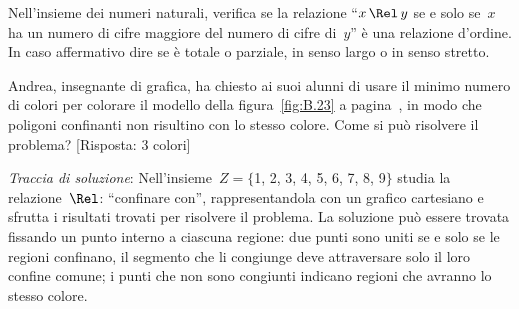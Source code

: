\begin{multicols}{2}
\begin{esercizio}
\label{ese:B.62}
Nell'insieme dei numeri naturali, verifica se la relazione ``$x \,\Rel\, y$ se e solo se~$x$ ha un numero di cifre maggiore del numero di cifre di~$y$''
è una relazione d'ordine. In caso affermativo dire se è totale o parziale, in senso largo o in senso stretto.
\end{esercizio}

\begin{esercizio}
\label{ese:B.63}
Andrea, insegnante di grafica, ha chiesto ai suoi alunni di usare il minimo numero di colori per colorare il modello della figura~\ref{fig:B.23} a pagina~\pageref{fig:B.23},
in modo che poligoni confinanti non risultino con lo stesso colore. Come si può risolvere il problema? [Risposta: 3 colori]

\emph{Traccia di soluzione}: Nell'insieme~$Z =\{$1, 2, 3, 4, 5, 6, 7, 8, 9$\}$ studia la relazione~$\Rel$: ``confinare con'', rappresentandola con un grafico cartesiano e sfrutta
i risultati trovati per risolvere il problema.
La soluzione può essere trovata fissando un punto interno a ciascuna regione: due punti sono uniti se e solo se le regioni confinano, il segmento che li congiunge
deve attraversare solo il loro confine comune; i punti che non sono congiunti indicano regioni che avranno lo stesso colore.
\end{esercizio}
\end{multicols}
